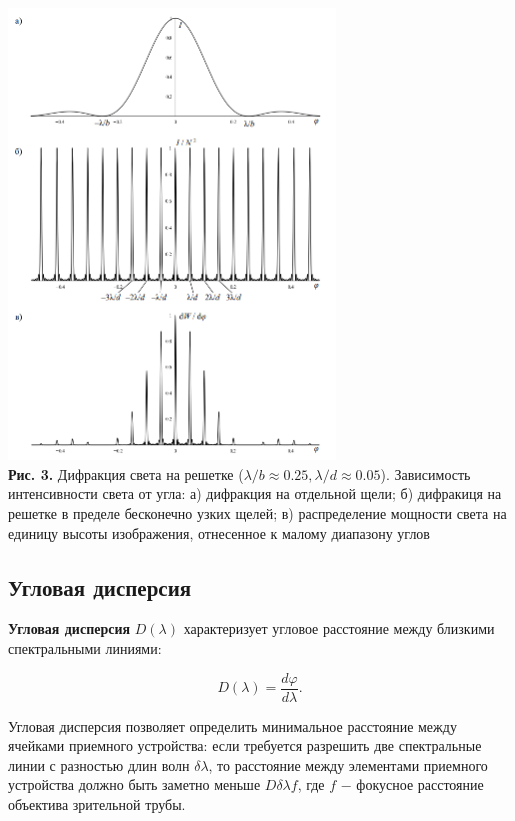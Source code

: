 \documentclass[a4paper,12pt]{article} %
\begin{document}
\begin{center}
\includegraphics[width=0.65\textwidth]{4.4.1_21.png}\\
\textbf{Рис. 3.}  Дифракция света на решетке ($\lambda / b \approx 0.25, \lambda / d \approx 0.05$). Зависимость интенсивности света от угла: а) дифракция на отдельной щели; б) дифракиця на решетке в пределе бесконечно узких щелей; в) распределение мощности света на единицу высоты изображения, отнесенное к малому диапазону углов\\ 
\end{center}

\subsection{Угловая дисперсия}
\hfill \break \textbf{Угловая дисперсия} $D(\lambda)$ характеризует угловое расстояние между близкими спектральными линиями:

\begin{equation}\label{ linkname }
D(\lambda) = \frac{d\varphi}{d\lambda}.
\end{equation}

\hfill \break Угловая дисперсия позволяет определить минимальное расстояние между ячейками приемного устройства: если требуется разрешить две спектральные линии с разностью длин волн $\delta \lambda$, то расстояние между элементами приемного устройства должно быть заметно меньше $D \delta \lambda f$, где $f$ $-$ фокусное расстояние объектива зрительной трубы. 
\end{document}
